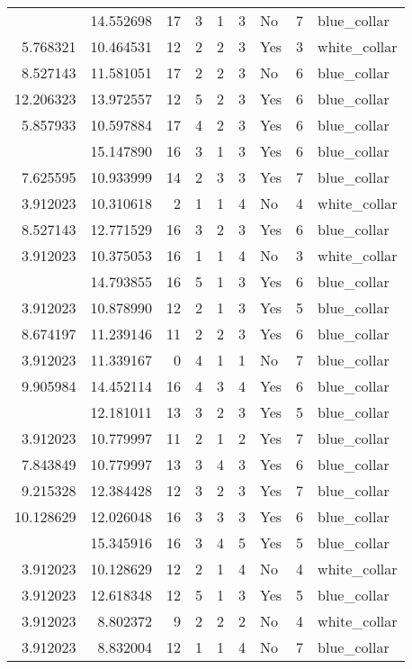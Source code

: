\documentclass[
]{article}
\begin{document}
\begin{longtable}[t]{rrrrrllrl}
\addlinespace
3.912023 & 14.552698 & 17 & 3 & 1 & 3 & No & 7 & blue\_collar\\
5.768321 & 10.464531 & 12 & 2 & 2 & 3 & Yes & 3 & white\_collar\\
8.527143 & 11.581051 & 17 & 2 & 2 & 3 & No & 6 & blue\_collar\\
12.206323 & 13.972557 & 12 & 5 & 2 & 3 & Yes & 6 & blue\_collar\\
5.857933 & 10.597884 & 17 & 4 & 2 & 3 & Yes & 6 & blue\_collar\\
\addlinespace
3.912023 & 15.147890 & 16 & 3 & 1 & 3 & Yes & 6 & blue\_collar\\
7.625595 & 10.933999 & 14 & 2 & 3 & 3 & Yes & 7 & blue\_collar\\
3.912023 & 10.310618 & 2 & 1 & 1 & 4 & No & 4 & white\_collar\\
8.527143 & 12.771529 & 16 & 3 & 2 & 3 & Yes & 6 & blue\_collar\\
3.912023 & 10.375053 & 16 & 1 & 1 & 4 & No & 3 & white\_collar\\
\addlinespace
3.912023 & 14.793855 & 16 & 5 & 1 & 3 & Yes & 6 & blue\_collar\\
3.912023 & 10.878990 & 12 & 2 & 1 & 3 & Yes & 5 & blue\_collar\\
8.674197 & 11.239146 & 11 & 2 & 2 & 3 & Yes & 6 & blue\_collar\\
3.912023 & 11.339167 & 0 & 4 & 1 & 1 & No & 7 & blue\_collar\\
9.905984 & 14.452114 & 16 & 4 & 3 & 4 & Yes & 6 & blue\_collar\\
\addlinespace
4.605170 & 12.181011 & 13 & 3 & 2 & 3 & Yes & 5 & blue\_collar\\
3.912023 & 10.779997 & 11 & 2 & 1 & 2 & Yes & 7 & blue\_collar\\
7.843849 & 10.779997 & 13 & 3 & 4 & 3 & Yes & 6 & blue\_collar\\
9.215328 & 12.384428 & 12 & 3 & 2 & 3 & Yes & 7 & blue\_collar\\
10.128629 & 12.026048 & 16 & 3 & 3 & 3 & Yes & 6 & blue\_collar\\
\addlinespace
10.205442 & 15.345916 & 16 & 3 & 4 & 5 & Yes & 5 & blue\_collar\\
3.912023 & 10.128629 & 12 & 2 & 1 & 4 & No & 4 & white\_collar\\
3.912023 & 12.618348 & 12 & 5 & 1 & 3 & Yes & 5 & blue\_collar\\
3.912023 & 8.802372 & 9 & 2 & 2 & 2 & No & 4 & white\_collar\\
3.912023 & 8.832004 & 12 & 1 & 1 & 4 & No & 7 & blue\_collar\\

\end{longtable}
\end{document}
